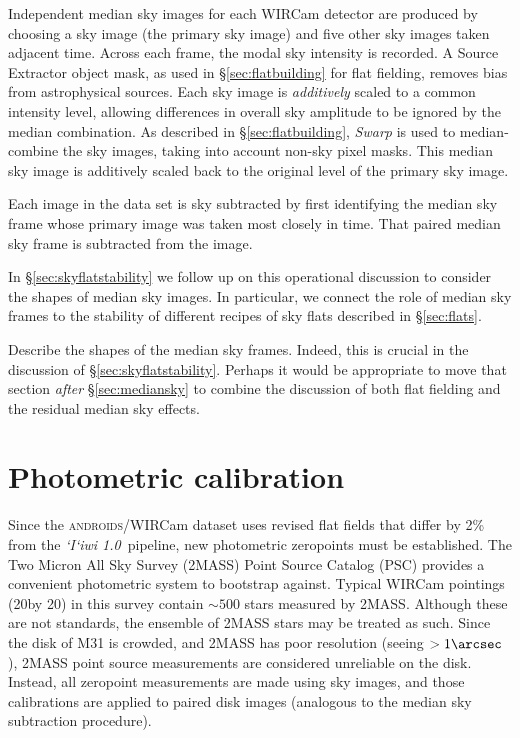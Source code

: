 \documentclass[iop]{emulateapj}
\newcommand{\sw}[1]{\textit{#1}} %
\newcommand{\iiwione}{\sw{`I`iwi 1.0}}
\newcommand{\androids}{\textsc{androids}}
\newcommand{\todo}[1]{\textcolor{RedOrange}{#1}} %
\newcommand{\Sec}[1]{\S\ref{sec:#1}}  %
\begin{document}
Independent median sky images for each WIRCam detector are produced by choosing a sky image (the primary sky image) and five other sky images taken adjacent time.
Across each frame, the modal sky intensity is recorded.
A Source Extractor object mask, as used in \Sec{flatbuilding} for flat fielding, removes bias from astrophysical sources.
Each sky image is \emph{additively} scaled to a common intensity level, allowing differences in overall sky amplitude to be ignored by the median combination.
As described in \Sec{flatbuilding}, \sw{Swarp} is used to median-combine the sky images, taking into account non-sky pixel masks.
This median sky image is additively scaled back to the original level of the primary sky image.

Each image in the data set is sky subtracted by first identifying the median sky frame whose primary image was taken most closely in time.
That paired median sky frame is subtracted from the image.

In \Sec{skyflatstability} we follow up on this operational discussion to consider the shapes of median sky images. In particular, we connect the role of median sky frames to the stability of different recipes of sky flats described in \Sec{flats}.

\todo{Describe the shapes of the median sky frames. Indeed, this is crucial in the discussion of \Sec{skyflatstability}. Perhaps it would be appropriate to move that section \emph{after} \Sec{mediansky} to combine the discussion of both flat fielding and the residual median sky effects.}

\section{Photometric calibration}
\label{sec:photocal}

Since the \androids/WIRCam dataset uses revised flat fields that differ by 2\% from the \iiwione\ pipeline, new photometric zeropoints must be established.
The Two Micron All Sky Survey (2MASS) Point Source Catalog (PSC) \citep{Skrutskie:2006} provides a convenient photometric system to bootstrap against.
Typical WIRCam pointings (20\arcmin by 20\arcmin) in this survey contain $\sim 500$ stars measured by 2MASS.
Although these are not standards, the ensemble of 2MASS stars may be treated as such.
Since the disk of M31 is crowded, and 2MASS has poor resolution (seeing $> 1\arcsec$), 2MASS point source measurements are considered unreliable on the disk.
Instead, all zeropoint measurements are made using sky images, and those calibrations are applied to paired disk images (analogous to the median sky subtraction procedure).
\end{document}
